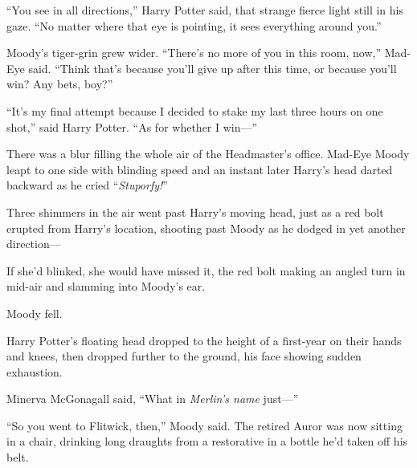 “You see in all directions,” Harry Potter said, that strange fierce light still in his gaze. “No matter where that eye is pointing, it sees everything around you.”

Moody’s tiger-grin grew wider. “There’s no more of you in this room, now,” Mad-Eye said. “Think that’s because you’ll give up after this time, or because you’ll win? Any bets, boy?”

“It’s my final attempt because I decided to stake my last three hours on one shot,” said Harry Potter. “As for whether I win—”

There was a blur filling the whole air of the Headmaster’s office. Mad-Eye Moody leapt to one side with blinding speed and an instant later Harry’s head darted backward as he cried “\emph{Stuporfy!}”

Three shimmers in the air went past Harry’s moving head, just as a red bolt erupted from Harry’s location, shooting past Moody as he dodged in yet another direction—

If she’d blinked, she would have missed it, the red bolt making an angled turn in mid-air and slamming into Moody’s ear.

Moody fell.

Harry Potter’s floating head dropped to the height of a first-year on their hands and knees, then dropped further to the ground, his face showing sudden exhaustion.

Minerva McGonagall said, “What in \emph{Merlin’s name} just—”

\later

“So you went to Flitwick, then,” Moody said. The retired Auror was now sitting in a chair, drinking long draughts from a restorative in a bottle he’d taken off his belt.

